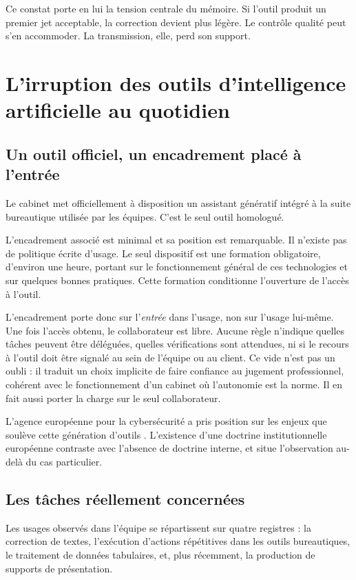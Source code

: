 Ce constat porte en lui la tension centrale du mémoire. Si l'outil produit un premier jet
acceptable, la correction devient plus légère. Le contrôle qualité peut s'en accommoder.
La transmission, elle, perd son support.

\section{L'irruption des outils d'intelligence artificielle au quotidien}

\subsection{Un outil officiel, un encadrement placé à l'entrée}

Le cabinet met officiellement à disposition un assistant génératif intégré à la suite
bureautique utilisée par les équipes. C'est le seul outil homologué.

L'encadrement associé est minimal et sa position est remarquable. Il n'existe pas de
politique écrite d'usage. Le seul dispositif est une formation obligatoire, d'environ une
heure, portant sur le fonctionnement général de ces technologies et sur quelques bonnes
pratiques. Cette formation conditionne l'ouverture de l'accès à l'outil.

L'encadrement porte donc sur l'\emph{entrée} dans l'usage, non sur l'usage lui-même. Une
fois l'accès obtenu, le collaborateur est libre. Aucune règle n'indique quelles tâches
peuvent être déléguées, quelles vérifications sont attendues, ni si le recours à l'outil
doit être signalé au sein de l'équipe ou au client. Ce vide n'est pas un oubli : il traduit
un choix implicite de faire confiance au jugement professionnel, cohérent avec le
fonctionnement d'un cabinet où l'autonomie est la norme. Il en fait aussi porter la charge
sur le seul collaborateur.

L'agence européenne pour la cybersécurité a pris position sur les enjeux que soulève cette
génération d'outils \cite{enisa2026}. L'existence d'une doctrine institutionnelle
européenne contraste avec l'absence de doctrine interne, et situe l'observation au-delà du
cas particulier.

\subsection{Les tâches réellement concernées}

Les usages observés dans l'équipe se répartissent sur quatre registres : la correction de
textes, l'exécution d'actions répétitives dans les outils bureautiques, le traitement de
données tabulaires, et, plus récemment, la production de supports de présentation.

